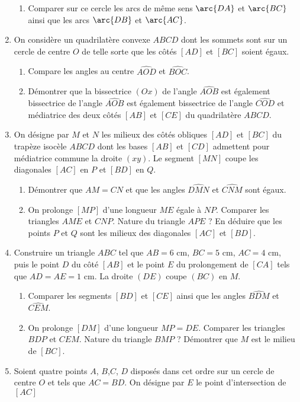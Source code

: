 \documentclass[12 pt]{report}
\theoremstyle{plain}
\newcounter{n}
\begin{document}
\begin{enumerate}
\begin{enumerate}
\item Comparer sur ce cercle les arcs de même sens $\arc{DA}$ et $\arc{BC}$ ainsi que les arcs $\arc{DB}$ et $\arc{AC}$. 
\end{enumerate}
\item On considère un quadrilatère convexe $ABCD$ dont les sommets sont sur un cercle de centre $O$ de telle sorte que les côtés $[AD]$ et $[BC]$ soient égaux. \begin{enumerate}
\item Compare les angles au centre $\widehat{AOD}$ et $\widehat{BOC}$.
\item Démontrer que la bissectrice $(Ox)$ de l'angle $\widehat{AOB}$ est également bissectrice de l'angle $\widehat{AOB}$ est également bissectrice de l'angle $\widehat{COD}$ et médiatrice des deux côtés $[AB]$ et $[CE]$ du quadrilatère $ABCD$. 
\end{enumerate}
\item On désigne par $M$ et $N$ les milieux des côtés obliques $[AD]$ et $[BC]$ du trapèze isocèle $ABCD$ dont les bases $[AB]$ et $[CD]$ admettent pour médiatrice commune la droite $(xy)$. Le segment $[MN]$ coupe les diagonales $[AC]$ en $P$ et $[BD]$ en $Q$. \begin{enumerate}
\item Démontrer que $AM=CN$ et que les angles $\widehat{DMN}$ et $\widehat{CNM}$ sont égaux. 
\item On prolonge $[MP]$ d'une longueur $ME$ égale à $NP$. Comparer les triangles $AME$ et $CNP$. Nature du triangle $APE$ ? En déduire que les points $P$ et $Q$ sont les milieux des diagonales $[AC]$ et $[BD]$.
\end{enumerate}
\item Construire un triangle $ABC$ tel que $AB= 6$ cm, $BC=5$ cm, $AC=4$ cm, puis le point $D$ du côté $[AB]$ et le point $E$ du prolongement de $[CA]$ tels que $AD=AE=1$ cm. La droite $(DE)$ coupe $(BC)$ en $M$. \begin{enumerate}
\item Comparer les segments $[BD]$ et $[CE]$ ainsi que les angles $\widehat{BDM}$ 
et $\widehat{CEM}$.
\item On prolonge $[DM]$ d'une longueur $MP=DE$. Comparer les triangles $BDP$ et $CEM$. Nature du triangle $BMP$ ? Démontrer que $M$ est le milieu de $[BC]$. 
\end{enumerate}
\item Soient quatre points $A$, $B$,$C$, $D$ disposés dans cet ordre sur un cercle de centre $O$ et tels que $AC=BD$. On désigne par $E$ le point d'intersection de $[AC]$

\end{enumerate}
\end{document}
